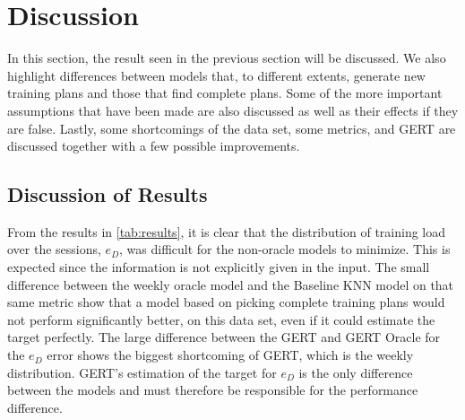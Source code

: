 \FloatBarrier
\section{Discussion}

In this section, the result seen in the previous section will be discussed.
We also highlight differences between models that, to different extents, generate new training plans and those that find complete plans.
Some of the more important assumptions that have been made are also discussed as well as their effects if they are false.
Lastly, some shortcomings of the data set, some metrics, and GERT are discussed together with a few possible improvements.

\subsection{Discussion of Results}

From the results in \cref{tab:results}, it is clear that the distribution of training load over the sessions, $e_D$, was difficult for the non-oracle models to minimize.
This is expected since the information is not explicitly given in the input.
The small difference between the weekly oracle model and the Baseline KNN model on that same metric show that a model based on picking complete training plans would not perform significantly better, on this data set, even if it could estimate the target perfectly.
The large difference between the GERT and GERT Oracle for the $e_D$ error shows the biggest shortcoming of GERT, which is the weekly distribution.
GERT's estimation of the target for $e_D$ is the only difference between the models and must therefore be responsible for the performance difference.



